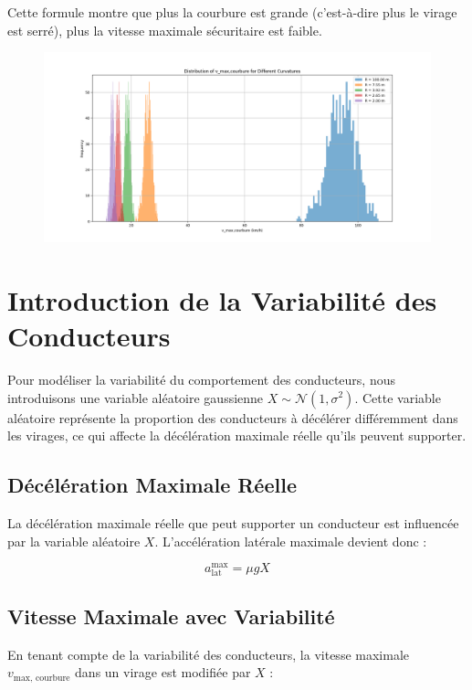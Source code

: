 \documentclass[a4paper,12pt]{article}
\begin{document}
Cette formule montre que plus la courbure est grande (c'est-à-dire plus le virage est serré), plus la vitesse maximale sécuritaire est faible.

\begin{figure}[h]
    \centering
    \includegraphics[width=1\linewidth]{Speed vs Curvature.png}

\end{figure}

\section{Introduction de la Variabilité des Conducteurs}

Pour modéliser la variabilité du comportement des conducteurs, nous introduisons une variable aléatoire gaussienne \( X \sim \mathcal{N}(1, \sigma^2) \). Cette variable aléatoire représente la proportion des conducteurs à décélérer différemment dans les virages, ce qui affecte la décélération maximale réelle qu'ils peuvent supporter.

\subsection{Décélération Maximale Réelle}

La décélération maximale réelle que peut supporter un conducteur est influencée par la variable aléatoire \( X \). L'accélération latérale maximale devient donc :

\[
a_{\text{lat}}^{\text{max}} = \mu g X
\]

\subsection{Vitesse Maximale avec Variabilité}

En tenant compte de la variabilité des conducteurs, la vitesse maximale \( v_{\text{max, courbure}} \) dans un virage est modifiée par \( X \) :
\end{document}
